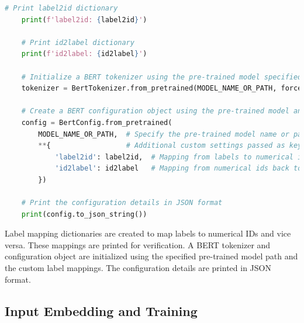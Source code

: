 \documentclass{solutionclass} %
\begin{document}
\begin{solution}
\begin{lstlisting}[language=Python, basicstyle=\ttfamily\footnotesize, keywordstyle=\color{blue}, commentstyle=\color{gray}]
    # Print label2id dictionary
    print(f'label2id: {label2id}')
    
    # Print id2label dictionary
    print(f'id2label: {id2label}')
    
    # Initialize a BERT tokenizer using the pre-trained model specified in MODEL_NAME_OR_PATH
    tokenizer = BertTokenizer.from_pretrained(MODEL_NAME_OR_PATH, force_download=True)
    
    # Create a BERT configuration object using the pre-trained model and additional custom settings
    config = BertConfig.from_pretrained(
        MODEL_NAME_OR_PATH,  # Specify the pre-trained model name or path
        **{                  # Additional custom settings passed as keyword arguments
            'label2id': label2id,  # Mapping from labels to numerical ids
            'id2label': id2label   # Mapping from numerical ids back to labels
        })
    
    # Print the configuration details in JSON format
    print(config.to_json_string())
    \end{lstlisting}
    
    Label mapping dictionaries are created to map labels to numerical IDs and vice versa. These mappings are printed for verification. A BERT tokenizer and configuration object are initialized using the specified pre-trained model path and the custom label mappings. The configuration details are printed in JSON format.
    

\end{solution}




\subsection*{Input Embedding and Training}
\end{document}
